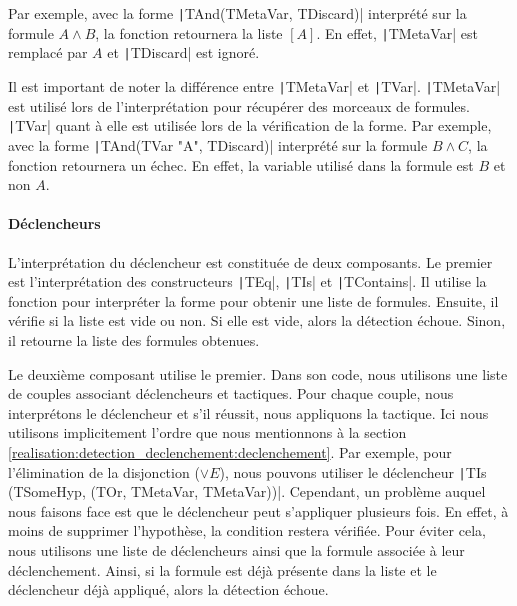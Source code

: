 \documentclass[french,titlepage]{article}
\begin{document}
Par exemple, avec la forme \texttt|TAnd(TMetaVar, TDiscard)| interprété sur la formule $A \land B$, la fonction retournera la liste $[A]$. En effet, \texttt|TMetaVar| est remplacé par $A$ et \texttt|TDiscard| est ignoré.

Il est important de noter la différence entre \texttt|TMetaVar| et \texttt|TVar|. \texttt|TMetaVar| est utilisé lors de l'interprétation pour récupérer des morceaux de formules. \texttt|TVar| quant à elle est utilisée lors de la vérification de la forme. Par exemple, avec la forme \texttt|TAnd(TVar "A", TDiscard)| interprété sur la formule $B \land C$, la fonction retournera un échec. En effet, la variable utilisé dans la formule est $B$ et non $A$.

\paragraph{Déclencheurs} \label{realisation:langage_detecter:interpretation:declencheurs}
L'interprétation du déclencheur est constituée de deux composants. Le premier est l'interprétation des constructeurs \texttt|TEq|, \texttt|TIs| et \texttt|TContains|. Il utilise la fonction pour interpréter la forme pour obtenir une liste de formules. Ensuite, il vérifie si la liste est vide ou non. Si elle est vide, alors la détection échoue. Sinon, il retourne la liste des formules obtenues.

Le deuxième composant utilise le premier. Dans son code, nous utilisons une liste de couples associant déclencheurs et tactiques. Pour chaque couple, nous interprétons le déclencheur et s'il réussit, nous appliquons la tactique. Ici nous utilisons implicitement l'ordre que nous mentionnons à la section \ref{realisation:detection_declenchement:declenchement}. Par exemple, pour l'élimination de la disjonction ($\lor E$), nous pouvons utiliser le déclencheur \texttt|TIs (TSomeHyp, (TOr, TMetaVar, TMetaVar))|. Cependant, un problème auquel nous faisons face est que le déclencheur peut s'appliquer plusieurs fois. En effet, à moins de supprimer l'hypothèse, la condition restera vérifiée. Pour éviter cela, nous utilisons une liste de déclencheurs ainsi que la formule associée à leur déclenchement. Ainsi, si la formule est déjà présente dans la liste et le déclencheur déjà appliqué, alors la détection échoue.
\end{document}
